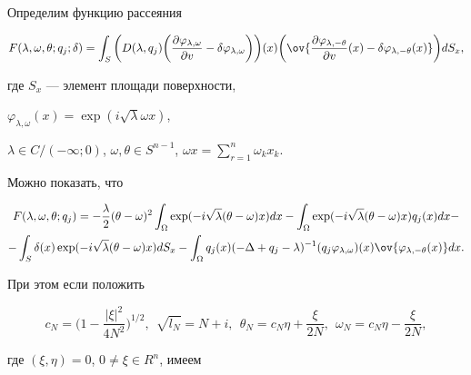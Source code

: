  


Определим функцию рассеяния 


$$ 


F(\lambda,\omega,\theta;q_j;\delta)=\int_S\bigg(D(\lambda,q_j) 


\bigg(\frac{\partial\varphi_{\lambda,\omega}}{\partial v}- 


\delta\varphi_{\lambda,\omega}\bigg)\bigg)(x) 


\bigg(\ov{\frac{\partial\varphi_{\lambda,-\theta}}{\partial v} 


(x)-\delta\varphi_{\lambda,-\theta}(x) 


}\bigg)d S_x, 


$$ 


где $S_x$ --- элемент площади поверхности, 


$\varphi_{\lambda,\omega}(x)=\exp(i\sqrt{\lambda}\omega x)$, 


$\lambda\in C/(-\infty;0)$, $\omega,\theta\in S^{n-1}$, $\omega 


x=\sum\limits^n_{r=1}\omega_k x_k$. 


 


Можно показать, что 


\begin{multline*} 


F(\lambda,\omega,\theta;q_j)=-\frac{\lambda}{2}(\theta-\omega)^2 


\int_\Omega\exp(-i\sqrt{\lambda}(\theta-\omega)x)d x-\int_\Omega 


\exp(-i\sqrt{\lambda}(\theta-\omega)x)q_j(x)d x-\\ 


% 


-\int_S \delta(x)\exp(-i\sqrt{\lambda}(\theta-\omega)x)d S_x- 


\int_\Omega q_j(x)(-\Delta+q_j-\lambda)^{-1}(q_j\varphi_{\lambda,\omega} 


)(x)\ov{\varphi_{\lambda,-\theta}(x)}d x. 


\end{multline*} 


При этом если положить 


$$ 


c_N=\bigg(1-\frac{|\xi|^2}{4N^2}\bigg)^{1/2},\ \ 


\sqrt{l_N}=N+i,\ \ \theta_N=c_N\eta+\frac{\xi}{2N}, 


\ \ \omega_N=c_N\eta-\frac{\xi}{2N}, 


$$ 


где $(\xi,\eta)=0$, $0\ne\xi\in R^n$, имеем 


